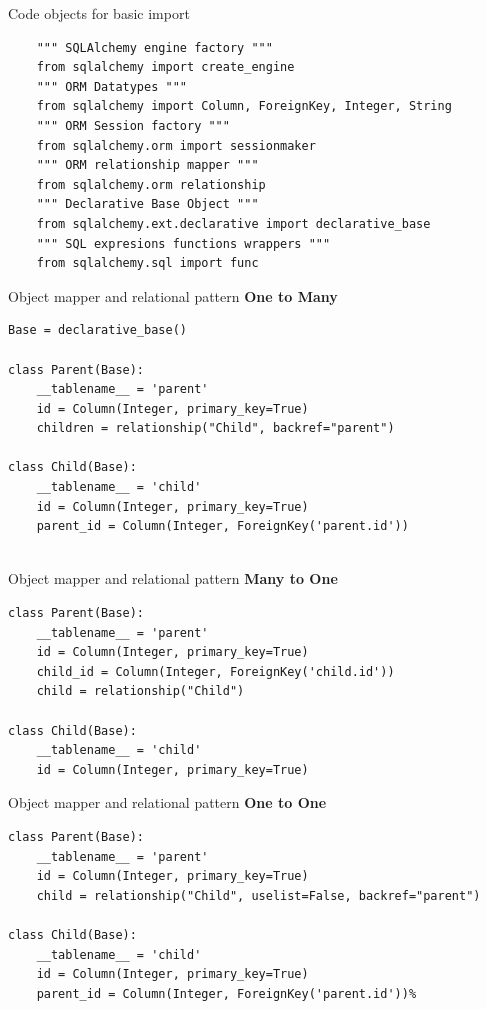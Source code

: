 \documentclass[seagull]{beamer}
\begin{document}
\begin{frame}[fragile]{Code objects for basic import}
\begin{verbatim}
	""" SQLAlchemy engine factory """
	from sqlalchemy import create_engine
	""" ORM Datatypes """ 
	from sqlalchemy import Column, ForeignKey, Integer, String
	""" ORM Session factory """ 
	from sqlalchemy.orm import sessionmaker
	""" ORM relationship mapper """ 
	from sqlalchemy.orm relationship
	""" Declarative Base Object """ 
	from sqlalchemy.ext.declarative import declarative_base
	""" SQL expresions functions wrappers """ 
	from sqlalchemy.sql import func
\end{verbatim}
\end{frame}

\begin{frame}[fragile]{Object mapper and relational pattern}
\textbf{One to Many}
\begin{verbatim}
Base = declarative_base()

class Parent(Base):
    __tablename__ = 'parent'
    id = Column(Integer, primary_key=True)
    children = relationship("Child", backref="parent")

class Child(Base):
    __tablename__ = 'child'
    id = Column(Integer, primary_key=True)
    parent_id = Column(Integer, ForeignKey('parent.id'))
        
\end{verbatim}
\end{frame}

\begin{frame}[fragile]{Object mapper and relational pattern}
\textbf{Many to One}
\begin{verbatim}
class Parent(Base):
    __tablename__ = 'parent'
    id = Column(Integer, primary_key=True)
    child_id = Column(Integer, ForeignKey('child.id'))
    child = relationship("Child")

class Child(Base):
    __tablename__ = 'child'
    id = Column(Integer, primary_key=True)
\end{verbatim}
\end{frame}

\begin{frame}[fragile]{Object mapper and relational pattern}
\textbf{One to One}
\begin{verbatim}
class Parent(Base):
    __tablename__ = 'parent'
    id = Column(Integer, primary_key=True)
    child = relationship("Child", uselist=False, backref="parent")

class Child(Base):
    __tablename__ = 'child'
    id = Column(Integer, primary_key=True)
    parent_id = Column(Integer, ForeignKey('parent.id'))%
\end{verbatim}
\end{frame}
\end{document}
